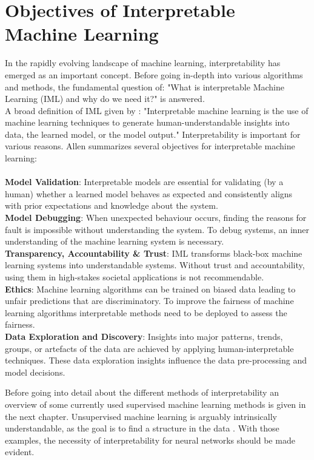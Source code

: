 
\chapter{Objectives of Interpretable Machine Learning}
\label{sec:OofIML}
In the rapidly evolving landscape of machine learning, interpretability has emerged as an important concept. Before going in-depth into various algorithms and methods, the fundamental question of: "What is interpretable Machine Learning (IML) and why do we need it?" is answered.
\\
A broad definition of IML given by \cite{allen2023interpretable}: "Interpretable machine learning is the use of machine learning techniques to generate human-understandable insights into data, the learned model, or the model output." Interpretability is important for various reasons. Allen\cite{allen2023interpretable} summarizes several objectives for interpretable machine learning: 
\\\\
\textbf{Model Validation}: Interpretable models are essential for validating (by a human) whether a learned model behaves as expected and consistently aligns with prior expectations and knowledge about the system.
\\
\textbf{Model Debugging}: When unexpected behaviour occurs, finding the reasons for fault is impossible without understanding the system. To debug systems, an inner understanding of the machine learning system is necessary.
\\
\textbf{Transparency, Accountability \& Trust}: IML transforms black-box machine learning systems into understandable systems. Without trust and accountability, using them in high-stakes societal applications is not recommendable.
\\
\textbf{Ethics}: Machine learning algorithms can be trained on biased data leading to unfair predictions that are discriminatory. To improve the fairness of machine learning algorithms interpretable methods need to be deployed to assess the fairness. 
\\
\textbf{Data Exploration and Discovery}: Insights into major patterns, trends, groups, or artefacts of the data are achieved by applying human-interpretable techniques. These data exploration insights influence the data pre-processing and model decisions. 

Before going into detail about the different methods of interpretability an overview of some currently used supervised machine learning methods is given in the next chapter. Unsupervised machine learning is arguably intrinsically understandable, as the goal is to find a structure in the data \cite{allen2023interpretable}. With those examples, the necessity of interpretability for neural networks should be made evident.

